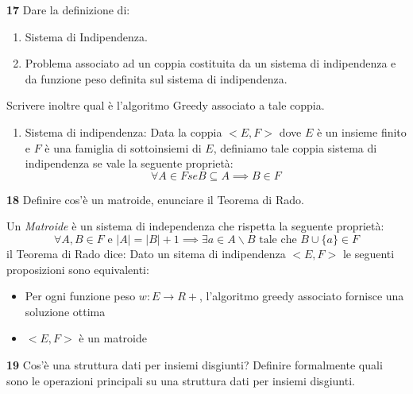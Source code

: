\documentclass[12pt, a4paper, openany]{book}
\newcommand{\domanda}[2]{\begin{box_domanda}\textbf{#1} #2\end{box_domanda}}
\newcommand{\risposta}[1]{#1}
\begin{document}
\domanda{17}{
Dare la definizione di:
\begin{enumerate}
    \item Sistema di Indipendenza.
    \item Problema associato ad
    un coppia costituita da un sistema di indipendenza e da funzione peso definita
    sul sistema di indipendenza.
\end{enumerate}
Scrivere inoltre qual è l’algoritmo Greedy associato a tale coppia.
}
\risposta{
\begin{enumerate}
    \item Sistema di indipendenza: Data la coppia $<E,F>$ dove $E$ è un insieme finito e $F$ è una famiglia di sottoinsiemi di $E$, definiamo tale coppia sistema di indipendenza se vale la seguente proprietà:
    \begin{equation*}
        \forall A \in F se B \subseteq A \implies B \in F
    \end{equation*}
\end{enumerate}

}
\domanda{18}{
Definire cos’è un matroide, enunciare il Teorema di Rado.}
\risposta{
Un \emph{Matroide} è un sistema di independenza che rispetta la seguente proprietà:
$$
	\forall A, B \in F \text{ e } |A| = |B| + 1 \implies \exists a \in A\backslash B \text{ tale che } B \cup \{a\} \in F
$$
il Teorema di Rado dice: Dato un sitema di indipendenza $<E,F>$ le seguenti proposizioni sono equivalenti:
\begin{itemize}
	\item Per ogni funzione peso $w : E \to R+$, l'algoritmo greedy associato fornisce una soluzione ottima
	\item $<E,F>$ è un matroide
\end{itemize}
}
\domanda{19}{
Cos’è una struttura dati per insiemi disgiunti? Definire formalmente quali
sono le operazioni principali su una struttura dati per insiemi disgiunti.
}
\end{document}
